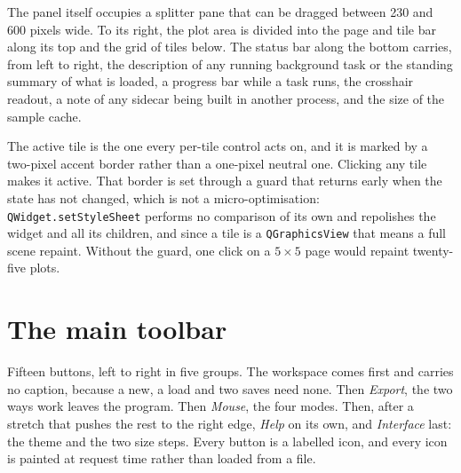 \documentclass[11pt,a4paper,oneside]{report}
\newcommand{\code}[1]{\texttt{#1}}
\begin{document}
The
panel itself occupies a splitter pane that can be dragged between 230 and 600
pixels wide. To its right, the plot area is divided into the page and tile bar
along its top and the grid of tiles below. The status bar along the bottom
carries, from left to right, the description of any running background task or
the standing summary of what is loaded, a progress bar while a task runs, the
crosshair readout, a note of any sidecar being built in another process, and the
size of the sample cache.

The active tile is the one every per-tile control acts on, and it is marked by a
two-pixel accent border rather than a one-pixel neutral one. Clicking any tile
makes it active. That border is set through a guard that returns early when the
state has not changed, which is not a micro-optimisation:
\code{QWidget.setStyleSheet} performs no comparison of its own and repolishes
the widget and all its children, and since a tile is a \code{QGraphicsView} that
means a full scene repaint. Without the guard, one click on a $5 \times 5$ page
would repaint twenty-five plots.

\section{The main toolbar}

Fifteen buttons, left to right in five groups. The workspace comes first and
carries no caption, because a new, a load and two saves need none. Then
\emph{Export}, the two ways work leaves the program. Then \emph{Mouse}, the
four modes. Then, after a stretch that pushes the rest to the right edge,
\emph{Help} on its own, and \emph{Interface} last: the theme and the two size
steps. Every button is a labelled icon, and every icon is painted at request
time rather than loaded from a file.
\end{document}
